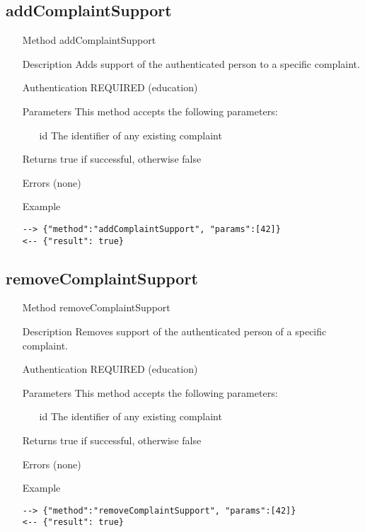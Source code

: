\documentclass[a4paper]{scrreprt}
\begin{document}
\clearpage
\subsection{addComplaintSupport}
\begin{enumerate}
\item[Method] addComplaintSupport
\item[Description] Adds support of the authenticated person to a specific complaint.
\item[Authentication] REQUIRED (education)
\item[Parameters] This method accepts the following parameters:
\begin{enumerate}
	\item[id] The identifier of any existing complaint
    \end{enumerate}
\item[Returns] true if successful, otherwise false
\item[Errors] (none)
\item[Example]
\begin{lstlisting}
--> {"method":"addComplaintSupport", "params":[42]}
<-- {"result": true}
\end{lstlisting}
\end{enumerate}

\subsection{removeComplaintSupport}
\begin{enumerate}
\item[Method] removeComplaintSupport
\item[Description] Removes support of the authenticated person of a specific complaint.
\item[Authentication] REQUIRED (education)
\item[Parameters] This method accepts the following parameters:
\begin{enumerate}
	\item[id] The identifier of any existing complaint
    \end{enumerate}
\item[Returns] true if successful, otherwise false
\item[Errors] (none)
\item[Example]
\begin{lstlisting}
--> {"method":"removeComplaintSupport", "params":[42]}
<-- {"result": true}
\end{lstlisting}
\end{enumerate}
\end{document}
